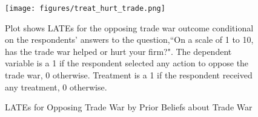 \documentclass{article}
\begin{document}


\begin{figure}
    \centering
    \texttt{[image: figures/treat\_hurt\_trade.png]}
    
    \raggedright \scriptsize Plot shows LATEs for the opposing trade war outcome conditional on the respondents' answers to the question,``On a scale of 1 to 10, has the trade war helped or hurt your firm?". The dependent variable is a 1 if the respondent selected any action to oppose the trade war, 0 otherwise. Treatment is a 1 if the respondent received any treatment, 0 otherwise.
    \caption{LATEs for Opposing Trade War by Prior Beliefs about Trade War}\label{hurtknow}
\end{figure}

\end{document}
